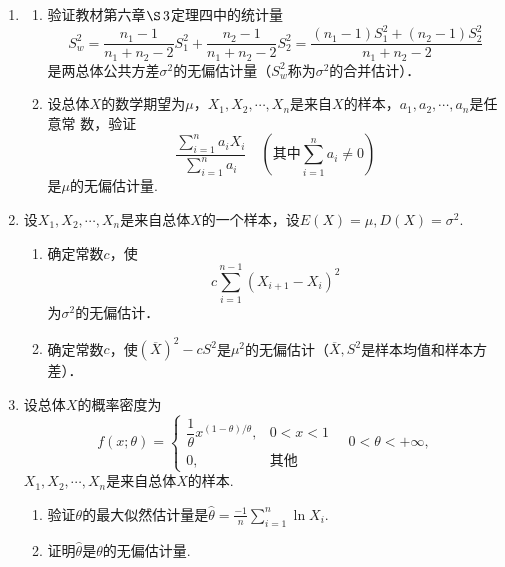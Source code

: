 \begin{enumerate}
    \item \begin{enumerate}
        \item 验证教材第六章$\S\, 3$定理四中的统计量
        $$S_w^2=\frac{n_1-1}{n_1+n_2-2}S_1^2+\frac{n_2-1}{n_1+n_2-2}S_2^2=\frac{(n_1-1)S_1^2+(n_2-1)S_2^2}{n_1+n_2-2}$$
        是两总体公共方差$\sigma^2$的无偏估计量（$S_w^2$称为$\sigma^2$的合并估计）．
        \item 设总体$X$的数学期望为$\mu$，$X_1,X_2,\cdots,X_n$是来自$X$的样本，$a_1,a_2,\cdots,a_n$是任意常
        数，验证
        $$\frac{\displaystyle{\sum_{i=1}^n a_i X_i}}{\displaystyle{\sum _{i=1}^n a_i}}\quad(\mbox{其中}\sum_{i=1}^n a_i \neq 0)$$
        是$\mu$的无偏估计量.
    \end{enumerate}



    \item 设$X_1,X_2,\cdots,X_n$是来自总体$X$的一个样本，设$E(X)=\mu,D(X)=\sigma^2$.
    \begin{enumerate}
        \item 确定常数$c$，使$$c\sum_{i=1}^{n-1}(X_{i+1}-X_i)^2$$为$\sigma^2$的无偏估计．
        \item 确定常数$c$，使$(\overline{X})^2-cS^2$是$\mu^2$的无偏估计（$\overline{X},S^2$是样本均值和样本方差）．
    \end{enumerate}



    \item 设总体$X$的概率密度为
    \renewcommand{\arraystretch}{1.3}
    $$f(x;\theta)=\left\{\begin{array}{ll}
        \dfrac{1}{\theta}x^{(1-\theta)/\theta}, & 0<x<1\\
        0, & \mbox{其他}
    \end{array}\right.\quad 0<\theta<+\infty,$$
    \renewcommand{\arraystretch}{1.0}
    $X_1,X_2,\cdots,X_n$是来自总体$X$的样本.
    \begin{enumerate}
        \item 验证$\theta$的最大似然估计量是$\displaystyle{\hat{\theta}=\frac{-1}{n}\sum_{i=1}^n \ln X_i}$.
        \item 证明$\hat{\theta}$是$\theta$的无偏估计量.
    \end{enumerate}



\end{enumerate}
